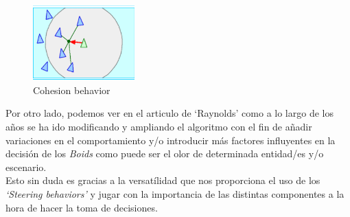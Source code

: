 \begin{figure}[ht]
\centering
\includegraphics[width=0.35\textwidth]{imagenes/marco_teo/cohesion.png}
\caption{Cohesion behavior}
\label{img:cohesion-b}
\end{figure}

Por otro lado, podemos ver en el articulo de `Raynolds' como a lo largo de los años se
ha ido modificando y ampliando el algoritmo con el fin de añadir variaciones en el
comportamiento y/o introducir más factores influyentes en la decisión de los 
\textit{Boids} como puede ser el olor de determinada entidad/es y/o escenario. \\
Esto sin duda es gracias a la versatílidad que nos proporciona el uso de los
\textit{`Steering behaviors'} y jugar con la importancia de las distintas componentes
a la hora de hacer la toma de decisiones.

